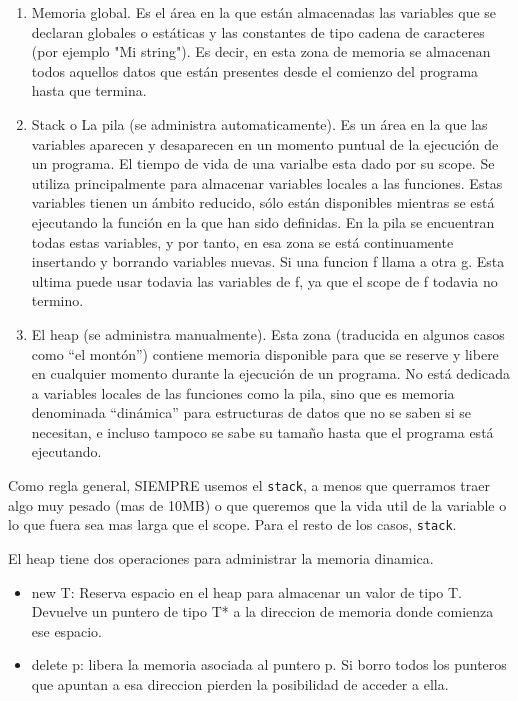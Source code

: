 \documentclass[11pt]{article}
\begin{document}
\begin{enumerate}
    \item Memoria global.
        Es el área en la que están almacenadas las variables
        que se declaran globales o estáticas y las constantes de tipo cadena de caracteres (por ejemplo "Mi string").
        Es decir, en esta zona de memoria se almacenan todos aquellos datos que
        están presentes desde el comienzo del programa hasta que termina.
    \item Stack o La pila (se administra automaticamente).
        Es un área en la que las variables aparecen y desaparecen en un momento
        puntual de la ejecución de un programa.
        El tiempo de vida de una varialbe esta dado por su scope.
        Se utiliza principalmente para almacenar variables locales a las funciones.
        Estas variables tienen un ámbito reducido, sólo están disponibles mientras
        se está ejecutando la función en la que han sido definidas.
        En la pila se encuentran todas estas variables, y por tanto, en esa zona
        se está continuamente insertando y borrando variables nuevas.
        Si una funcion f llama a otra g. Esta ultima puede usar todavia las variables de
        f, ya que el scope de f todavia no termino.
    \item El heap (se administra manualmente).
        Esta zona (traducida en algunos casos como “el montón”) contiene memoria
        disponible para que se reserve y libere en cualquier momento durante la
        ejecución de un programa.
        No está dedicada a variables locales de las funciones como la pila, sino
        que es memoria denominada “dinámica” para estructuras de datos que no se
        saben si se necesitan, e incluso tampoco se sabe su tamaño hasta que el
        programa está ejecutando.
\end{enumerate}

Como regla general, SIEMPRE usemos el \texttt{stack}, a menos que querramos traer
algo muy pesado (mas de 10MB) o que queremos que la vida util de la variable o
lo que fuera sea mas larga que el scope.
Para el resto de los casos, \texttt{stack}.

El heap tiene dos operaciones para administrar la memoria dinamica.
\begin{itemize}
    \item new T: Reserva espacio en el heap para almacenar un valor
        de tipo T. Devuelve un puntero de tipo T* a la direccion de memoria
        donde comienza ese espacio.
    \item delete p: libera la memoria asociada al puntero p.
        Si borro todos los punteros que apuntan a esa direccion pierden la posibilidad
        de acceder a ella.
\end{itemize}
\end{document}

